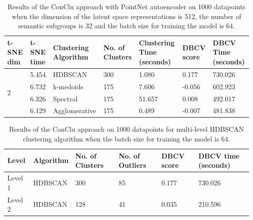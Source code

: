 \begin{table}[H]
  \setlength\extrarowheight{10pt}
  \caption{Results of the ConClu approach with PointNet autoencoder on 1000 datapoints when the dimension of the latent space representations is 512, the number of semantic subgroups is 32 and the batch size for training the model is 64. }
  \centering
  \begin{tabular}{|p{30pt}|p{50pt}|p{60pt}|p{50pt}|p{50pt}|p{50pt}|p{40pt}|}
    \toprule
    \ac{t-SNE} dim	& \ac{t-SNE} time & Clustering Algorithm & No. of Clusters & Clustering Time (seconds) & \ac{DBCV} score & \ac{DBCV} Time (seconds)\\
    \midrule
    \multirow{4}{30pt}{2}	& 5.454 & \ac{HDBSCAN}	& 300	& 1.080 & 0.177	& 730.026 \\ \cline{2-7} 
    & 6.732 & k-medoids	& 175	& 7.606 & -0.056	& 602.923 \\ \cline{2-7} 
    & 6.326 & Spectral	& 175	& 51.657 & 0.008	& 492.017 \\ \cline{2-7}
    & 6.129 & Agglomerative	& 175	& 0.489 & -0.007 &	481.838 \\ 
    \bottomrule
  \end{tabular}
  \label{tab:conclu_batch_64}
\end{table}

\begin{table}[H]
  \setlength\extrarowheight{10pt}
  \caption{Results of the ConClu approach on 1000 datapoints for multi-level \ac{HDBSCAN} clustering algorithm when the batch size for training the model is 64. }
  \centering
  \begin{tabular}{|l|l|l|l|l|l|}
    \toprule
    Level & Algorithm	& No. of Clusters	& No. of Outliers	& DBCV score	& \ac{DBCV} time (seconds)	\\  
    \midrule
    Level 1 & \ac{HDBSCAN} & 300	& 85	& 0.177	& 730.026 \\ \cline{1-6}
    Level 2 & \ac{HDBSCAN} & 128	& 41	& 0.035	& 210.596 \\ 
    \bottomrule
  \end{tabular}
  \label{tab:conclu_batch_64_levels}
\end{table}

